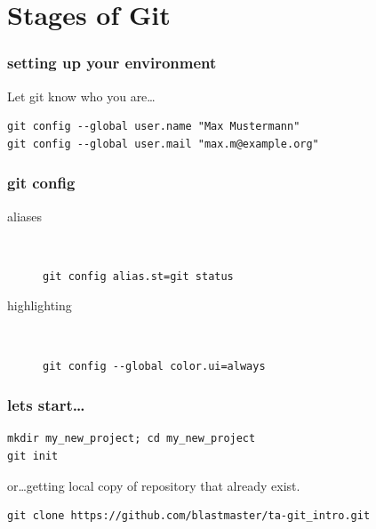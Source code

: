 \section{Stages of Git}


\begin{frame}[fragile]
    \frametitle{setting up your environment}
    Let git know who you are\ldots
    \begin{lstlisting}
git config --global user.name "Max Mustermann"
git config --global user.mail "max.m@example.org"
    \end{lstlisting}
\end{frame}

\begin{frame}[fragile]
    \frametitle{git config}
    \begin{description}
        \item[aliases] \hfill \\
            \begin{lstlisting}
git config alias.st=git status
            \end{lstlisting}
        \item[highlighting] \hfill \\
            \begin{lstlisting}
git config --global color.ui=always
            \end{lstlisting}
    \end{description}
\end{frame}

\begin{frame}[fragile]
    \frametitle{lets start\ldots}
    \begin{lstlisting}
mkdir my_new_project; cd my_new_project
git init
    \end{lstlisting}
    or\ldots getting local copy of repository that already exist.\\
    \begin{lstlisting}
git clone https://github.com/blastmaster/ta-git_intro.git
    \end{lstlisting}
\end{frame}

